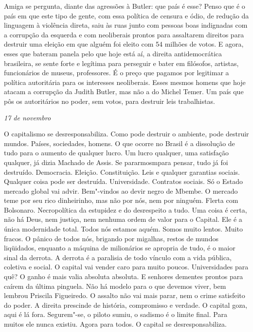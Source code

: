 Amiga se pergunta, diante das agressões à Butler: que país é esse? Penso
que é o país em que este tipo de gente, com essa política de censura e
ódio, de redução da linguagem à violência direta, saiu às ruas junto com
pessoas boas indignadas com a corrupção da esquerda e com neoliberais
prontos para assaltarem direitos para destruir uma eleição em que alguém
foi eleito com 54 milhões de votos. E agora, esses que bateram panela
pelo que hoje está aí, a direita antidemocrática brasileira, se sente
forte e legítima para perseguir e bater em filósofos, artistas,
funcionários de museus, professores. É o preço que pagamos por legitimar
a política autoritária para os interesses neoliberais. Esses mesmos
homens que hoje atacam a corrupção da Judith Butler, mas não a do Michel
Temer. Um país que pôs os autoritários no poder, sem votos, para
destruir leis trabalhistas.

\begin{flushright}
\emph{17 de novembro}
\end{flushright}

O capitalismo se desresponsabiliza. Como pode destruir o ambiente, pode
destruir mundos. Países, sociedades, homens. O que ocorre no Brasil é a
dissolução de tudo para o aumento de qualquer lucro. Um lucro qualquer,
uma satisfação qualquer, já dizia Machado de Assis. Se pararmosmpara
pensar, tudo já foi destruído. Democracia. Eleição. Constituição. Leis e
qualquer garantias sociais. Qualquer coisa pode ser destruída.
Universidade. Contratos sociais. Só o Estado mercado global vai advir.
Bem"-vindos ao devir negro de Mbembe. O mercado teme por seu rico
dinheirinho, mas não por nós, nem por ninguém. Flerta com Bolsonaro.
Necropolítica da estupidez e do desrespeito a tudo. Uma coisa é certa,
não há Deus, nem justiça, nem nenhuma ordem de valor para o Capital. Ele
é a única modernidade total. Todos nós estamos aquém. Somos muito
lentos. Muito fracos. O pânico de todos nós, brigando por migalhas,
restos de mundos liqüidados, enquanto a máquina de milionários se
apropria de tudo, é o maior sinal da derrota. A derrota é a paralisia de
todo vínculo com a vida pública, coletiva e social. O capital vai vender
caro para muito poucos. Universidades para quê? O ganho é mais valia
absoluta absoluta. E senhores dementes prontos para caírem da última
pinguela. Não há modelo para o que devemos viver, bem lembrou Priscila
Figueiredo. O assalto não vai mais parar, nem o crime satisfeito do
poder. A direita prescinde de história, compromisso e verdade. O capital
goza, aqui é lá fora. Segurem"-se, o piloto sumiu, o sadismo é o limite
final. Para muitos ele nunca existiu. Agora para todos. O capital se
desresponsabiliza.

